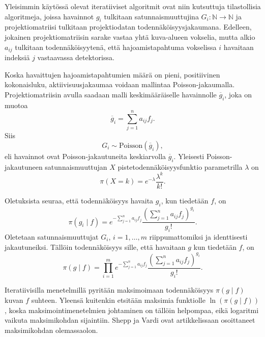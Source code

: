 Yleisimmin käytössä olevat iteratiiviset algoritmit ovat niin kutsuttuja tilastollisia algoritmeja, joissa havainnot $g_i$ tulkitaan satunnaismuuttujina $G_i\colon\mathbb{N}\to\mathbb{N}$\cite{wettenhovi_omegaopen-source_2021, kaipio_statistical_2005} ja projektiomatriisi tulkitaan projektiodatan todennäköisyysjakaumana\cite{boudjelal_novel_2021}. Edelleen, jokainen projektiomatriisin sarake vastaa yhtä kuva-alueen vokselia, mutta alkio $a_{ij}$ tulkitaan todennäköisyytenä, että hajoamistapahtuma vokselissa $i$ havaitaan indeksiä $j$ vastaavassa detektorissa\cite{boudjelal_novel_2021}.

Koska havaittujen hajoamistapahtumien määrä on pieni, positiivinen kokonaisluku, aktiivisuusjakaumaa voidaan mallintaa Poisson-jakaumalla\cite{kaipio_statistical_2005}. Projektiomatriisin avulla saadaan malli keskimääräiselle havainnolle $\overline{g}_i$, joka on muotoa\cite{boudjelal_novel_2021, shepp_maximum_1982}
\begin{equation*}
    \overline{g}_i=\sum_{j=1}^{n}a_{ij}f_j.
\end{equation*}
Siis
\begin{equation*}
    G_i\sim\text{Poisson}(\overline{g}_i),
\end{equation*}
eli havainnot ovat Poisson-jakautuneita keskiarvolla $\overline{g}_i$\cite{kaipio_statistical_2005, bruyant_analytic_2002, wettenhovi_transmission_2021}. Yleisesti Poisson-jakautuneen satunnaismuuttujan $X$ pistetodennäköisyysfunktio parametrilla $\lambda$ on
\begin{equation*}
    \pi(X=k)=e^{-\lambda}\frac{\lambda^{k}}{k!}.
\end{equation*}

Oletuksista seuraa, että todennäköisyys havaita $g_i$, kun tiedetään $f$, on
\begin{equation*}
    \pi(g_i \mid f)=e^{-\sum_{j=1}^{n}a_{ij}f_j}\frac{\left( \sum_{j=1}^{n}a_{ij}f_j \right)^{g_i}}{g_i!}.
\end{equation*}
Oletetaan satunnaismuuttujat $G_i$, $i=1,\ldots, m$ riippumattomiksi ja identtisesti jakautuneiksi. Tällöin todennäköisyys sille, että havaitaan $g$ kun tiedetään $f$, on
\begin{equation*}
    \pi(g\mid f)=\prod_{i=1}^{m}e^{-\sum_{j=1}^{n}a_{ij}f_j}\frac{\left( \sum_{j=1}^{n}a_{ij}f_j \right)^{g_i}}{g_i!}.
\end{equation*}

Iteratiivisilla menetelmillä pyritään maksimoimaan todennäköisyys $\pi(g\mid f)$ kuvan $f$ suhteen. Yleensä kuitenkin etsitään maksimia funktiolle $\ln(\pi(g\mid f))$, koska maksimointimenetelmien johtaminen on tällöin helpompaa, eikä logaritmi vaikuta maksimikohdan sijaintiin. Shepp ja Vardi ovat artikkelissaan\cite{shepp_maximum_1982} osoittaneet maksimikohdan olemassaolon.

